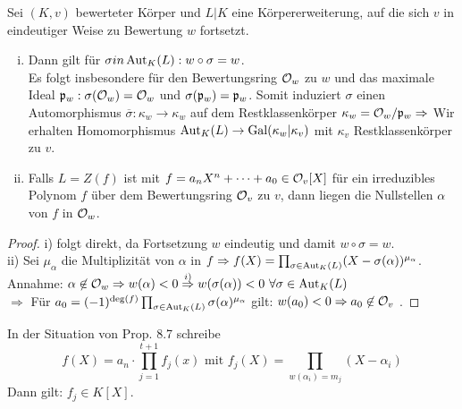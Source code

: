 \begin{Bem}
Sei $(K,v)$ bewerteter Körper und $L|K$ eine Körpererweiterung, auf die sich $v$ in eindeutiger Weise zu Bewertung $w$ fortsetzt.
\begin{enumerate}[i)]
\item Dann gilt für $\sigma in \operatorname{Aut}_K(L): w \circ \sigma = w$.\\
Es folgt insbesondere für den Bewertungsring $\mathcal{O}_w$ zu $w$ und das maximale Ideal $\mathfrak{p}_w: \sigma(\mathcal{O}_w)=\mathcal{O}_w$ und $\sigma(\mathfrak{p}_w)=\mathfrak{p}_w$. Somit induziert $\sigma$ einen Automorphismus $\overline{\sigma}: \kappa_w \to \kappa_w$ auf dem Restklassenkörper $\kappa_w=\mathcal{O}_w/\mathfrak{p}_w \Rightarrow$ Wir erhalten Homomorphismus $\operatorname{Aut}_K(L) \to \operatorname{Gal}(\kappa_w|\kappa_v)$ mit $\kappa_v$ Restklassenkörper zu $v$.
\item Falls $L=Z(f)$ ist mit $f=a_nX^n+\dots+a_0 \in \mathcal{O}_v[X]$ für ein irreduzibles Polynom $f$ über dem Bewertungsring $\mathcal{O}_v$ zu $v$, dann liegen die Nullstellen $\alpha$ von $f$ in $\mathcal{O}_w$.
\end{enumerate}
\end{Bem}

\begin{proof}
i) folgt direkt, da Fortsetzung $w$ eindeutig und damit $w \circ \sigma = w$.\\
ii) Sei $\mu_\alpha$ die Multiplizität von $\alpha$ in $f \Rightarrow f(X)= \prod_{\sigma \in \operatorname{Aut}_K(L)} (X-\sigma(\alpha))^{\mu_\alpha}$.\\
Annahme: $\alpha \not \in \O_w \Rightarrow w(\alpha)<0 \stackrel{i)}{\Rightarrow} w(\sigma(\alpha))<0 \ \forall \sigma \in \Aut_K(L)$\\
$\Rightarrow$ Für $a_0=(-1)^{\deg(f)} \prod_{\sigma \in \operatorname{Aut}_K(L)} \sigma(\alpha)^{\mu_\alpha}$ gilt: $w(a_0)<0 \Rightarrow a_0 \not \in \mathcal{O}_v$ \Lightning.
\end{proof}

\begin{Prop}
In der Situation von Prop. 8.7 schreibe
\[ f(X)=a_n \cdot \prod_{j=1}^{t+1} f_j(x) \text{ mit } f_j(X)= \prod_{w(\alpha_i)=m_j} (X-\alpha_i)\]
Dann gilt: $f_j \in K[X]$.
\end{Prop}

